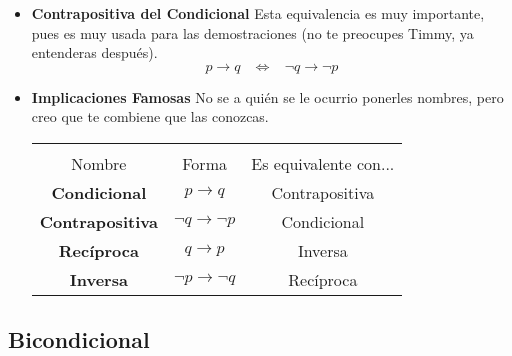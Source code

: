 \documentclass[12pt, fleqn]{report}                             %
\DeclareMathOperator \Space {\quad}                             %
\DeclareMathOperator \MiniSpace {\;}                            %
\newcommand \lequal {\MiniSpace \Leftrightarrow \MiniSpace}     %
\begin{document}
                    \begin{itemize}
                        \item \textbf{Contrapositiva del Condicional}
                                Esta equivalencia es muy importante, pues es muy usada para las demostraciones
                                (no te preocupes Timmy, ya entenderas después).
                                \begin{equation*}
                                    p \to q \lequal \lnot q \to \lnot p
                                \end{equation*}

                        \item \textbf{Implicaciones Famosas}
                                No se a quién se le ocurrio ponerles nombres, pero creo que te combiene
                                que las conozcas.

                                \begin{tabular}{ |c|c|c| } 
                                    \hline &&\\
                                    \large{Nombre} & \large{Forma} & \large{Es equivalente con...}      \\[0.5em]
                                    \hline \hline
                                    
                                    \textbf{Condicional}    & $p \to q$             & Contrapositiva    \\ \hline
                                    \textbf{Contrapositiva} & $\lnot q \to \lnot p$ & Condicional       \\ \hline\hline 
                                    
                                    \textbf{Recíproca}      & $q \to p$             & Inversa           \\ \hline
                                    \textbf{Inversa}        & $\lnot p \to \lnot q$ & Recíproca         \\ \hline
                                \end{tabular}
                    \end{itemize}


            \clearpage
            \subsection{Bicondicional}
\end{document}

